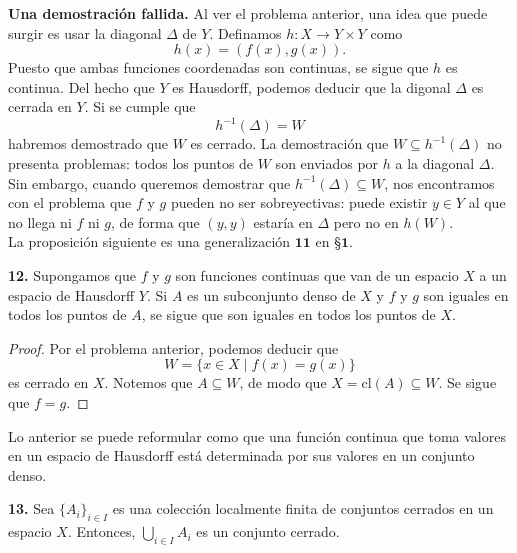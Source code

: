 \documentclass{article}
\begin{document}
\textbf{Una demostración fallida. } Al ver el problema anterior, una idea que puede surgir es usar la diagonal $\Delta$ de $Y$. Definamos $h: X \rightarrow Y \times Y$ como 
$$ h(x) = ( f(x), g(x) ). $$
Puesto que ambas funciones coordenadas son continuas, se sigue que $h$ es continua. Del hecho que $Y$ es Hausdorff, podemos deducir que la digonal $\Delta$ es cerrada en $Y$. Si se cumple que
$$ h^{-1}(\Delta) = W $$
habremos demostrado que $W$ es cerrado. La demostración que $W \subseteq h^{-1}(\Delta)$ no presenta problemas: todos los puntos de $W$ son enviados por $h$ a la diagonal $\Delta$. 
Sin embargo, cuando queremos demostrar que $h^{-1}(\Delta) \subseteq W$, nos encontramos con el problema que $f$ y $g$ pueden no ser sobreyectivas: puede existir $y \in Y$ al que no llega ni $f$ ni $g$, de forma que $(y, y)$ estaría en $\Delta$ pero no en $h(W)$.\\

La proposición siguiente es una generalización $\mathbf{11}$ en §$\mathbf{1}$.

\begin{mybox}
	\textbf{12. } Supongamos que $f$ y $g$ son funciones continuas que van de un espacio $X$ a un espacio de Hausdorff $Y$. Si $A$ es un subconjunto denso de $X$ y $f$ y $g$ son iguales en todos los puntos de $A$, se sigue que son iguales en todos los puntos de $X$. 
\end{mybox}	
\begin{proof}
	Por el problema anterior, podemos deducir que 
	$$ W = \{ x \in X \mid f(x) = g(x) \}$$
	es cerrado en $X$. Notemos que $A \subseteq W$, de modo que $X = \text{cl}(A) \subseteq W$. Se sigue que $f = g$. 
\end{proof}

Lo anterior se puede reformular como que una función continua que toma valores en un espacio de Hausdorff está determinada por sus valores en un conjunto denso. \\

\begin{mybox}
	\textbf{13. } Sea $\{A_{i} \}_{i \in I}$ es una colección localmente finita de conjuntos cerrados en un espacio $X$. Entonces, $\bigcup_{i \in I} A_{i}$ es un conjunto cerrado. 
\end{mybox}	
\end{document}
